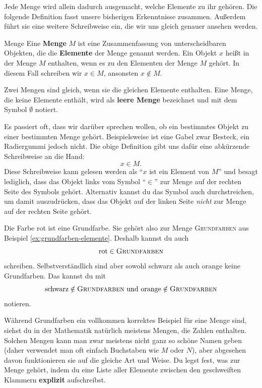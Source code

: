 \documentclass[../../main.tex]{subfiles}
\begin{document}
Jede Menge wird allein dadurch ausgemacht, welche Elemente zu ihr gehören. Die folgende Definition fasst unsere bisherigen Erkenntnisse zusammen. Außerdem führt sie eine weitere Schreibweise ein, die wir uns gleich genauer ansehen werden.

\begin{definition}{Menge}
    Eine \textbf{Menge} $M$ ist eine Zusammenfassung von unterscheidbaren Objekten, die die \textbf{Elemente} der Menge genannt werden. Ein Objekt $x$ heißt in der Menge $M$ enthalten, wenn es zu den Elementen der Menge $M$ gehört. In diesem Fall schreiben wir $x\in M$, ansonsten $x\notin M$.

    Zwei Mengen sind gleich, wenn sie die gleichen Elemente enthalten. Eine Menge, die keine Elemente enthält, wird als \textbf{leere Menge} bezeichnet und mit dem Symbol $\emptyset$ notiert.
\end{definition}

Es passiert oft, dass wir darüber sprechen wollen, ob ein bestimmtes Objekt zu einer bestimmten Menge gehört. Beispielsweise ist eine Gabel zwar Besteck, ein Radiergummi jedoch nicht. Die obige Definition gibt uns dafür eine abkürzende Schreibweise an die Hand:
\[x\in M.\]
Diese Schreibweise kann gelesen werden als \enquote{$x$ ist ein Element von $M$} und besagt lediglich, dass das Objekt links vom Symbol \enquote{$\in$} zur Menge auf der rechten Seite des Symbols gehört. Alternativ kannst du das Symbol auch durchstreichen, um damit auszudrücken, dass das Objekt auf der linken Seite \emph{nicht} zur Menge auf der rechten Seite gehört.

\begin{example}{}
    Die Farbe rot ist eine Grundfarbe. Sie gehört also zur Menge \textsc{Grundfarben} aus Beispiel \ref{ex:grundfarben-elemente}. Deshalb kannst du auch
    \[\text{rot}\in\textsc{Grundfarben}\]
    schreiben. Selbstverständlich sind aber sowohl schwarz als auch orange keine Grundfarben. Das kannst du mit
    \[\text{schwarz}\notin\textsc{Grundfarben}~\text{und}~\text{orange}\notin\textsc{Grundfarben}\]
    notieren.
\end{example}

Während Grundfarben ein vollkommen korrektes Beispiel für eine Menge sind, siehst du in der Mathematik natürlich meistens Mengen, die Zahlen enthalten. Solchen Mengen kann man zwar meistens nicht ganz so schöne Namen geben (daher verwendet man oft einfach Buchstaben wie $M$ oder $N$), aber abgesehen davon funktionieren sie auf die gleiche Art und Weise. Du legst fest, was zur Menge gehört, indem du eine Liste aller Elemente zwischen den geschweiften Klammern \textbf{explizit} aufschreibst.
\end{document}
